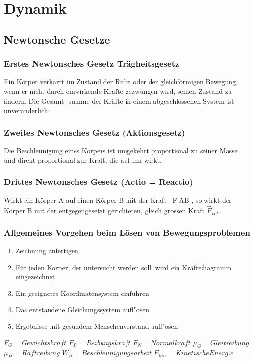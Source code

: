 \newpage
\section{Dynamik}
\subsection{Newtonsche Gesetze}
\subsubsection{Erstes Newtonsches Gesetz Trägheitsgesetz}
Ein Körper verharrt im Zustand der Ruhe oder der gleichförmigen Bewegung, wenn er
nicht durch einwirkende Kräfte gezwungen wird, seinen Zustand zu ändern. Die Gesamt-
summe der Kräfte in einem abgeschlossenen System ist unveränderlich:

\subsubsection{Zweites Newtonsches Gesetz (Aktionsgesetz)}
Die Beschleunigung eines Körpers ist umgekehrt proportional zu seiner Masse und direkt
proportional zur Kraft, die auf ihn wirkt.

\subsubsection{Drittes Newtonsches Gesetz (Actio = Reactio)}
Wirkt ein Körper A auf einen Körper B mit der Kraft ~F AB , so wirkt der Körper B mit der
entgegengesetzt gerichteten, gleich grossen Kraft $\overrightarrow{F}_{BA}$.

\subsubsection{Allgemeines Vorgehen beim Lösen von Bewegungsproblemen}
\begin{enumerate}
	\item Zeichnung anfertigen
	\item Für jeden Körper, der untersucht werden soll, wird ein Kräftediagramm eingezeichnet
	\item Ein geeignetes Koordinatensystem einführen
	\item  Das entstandene Gleichungssystem aufl"osen
	\item  Ergebnisse mit gesundem Menschenverstand aufl"osen
\end{enumerate}

$F_{G} = Gewichtskraft$
$F_{R} = Reibungskraft$
$F_{N} = Normalkraft$
$\mu_{G} = Gleitreibung$
$\mu_{H} = Haftreibung$
$W_{B} = Beschleunigungsarbeit$
$E_{kin} = Kinetische Energie$


